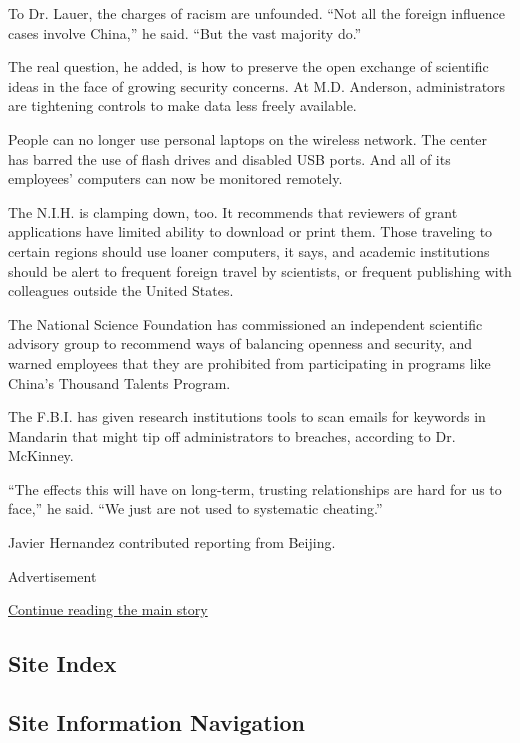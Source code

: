 To Dr. Lauer, the charges of racism are unfounded. ``Not all the foreign
influence cases involve China,'' he said. ``But the vast majority do.''

The real question, he added, is how to preserve the open exchange of
scientific ideas in the face of growing security concerns. At M.D.
Anderson, administrators are tightening controls to make data less
freely available.

People can no longer use personal laptops on the wireless network. The
center has barred the use of flash drives and disabled USB ports. And
all of its employees' computers can now be monitored remotely.

The N.I.H. is clamping down, too. It recommends that reviewers of grant
applications have limited ability to download or print them. Those
traveling to certain regions should use loaner computers, it says, and
academic institutions should be alert to frequent foreign travel by
scientists, or frequent publishing with colleagues outside the United
States.

The National Science Foundation has commissioned an independent
scientific advisory group to recommend ways of balancing openness and
security, and warned employees that they are prohibited from
participating in programs like China's Thousand Talents Program.

The F.B.I. has given research institutions tools to scan emails for
keywords in Mandarin that might tip off administrators to breaches,
according to Dr. McKinney.

``The effects this will have on long-term, trusting relationships are
hard for us to face,'' he said. ``We just are not used to systematic
cheating.''

Javier Hernandez contributed reporting from Beijing.

Advertisement

\protect\hyperlink{after-bottom}{Continue reading the main story}

\hypertarget{site-index}{%
\subsection{Site Index}\label{site-index}}

\hypertarget{site-information-navigation}{%
\subsection{Site Information
Navigation}\label{site-information-navigation}}

